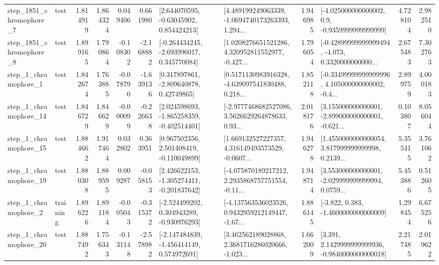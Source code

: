 \begin{tabular}{llrrrrllrlrr}
  step\_1851\_chromophore\_7 &      test &      1.814919 &    1.864324 &      0.049406 &  0.661980 &     [2.644070595, -0.63045902, 0.854424213] &  [4.489199249063339, -1.0694740173263393, 1.294... &       1.946985 &     [-4.025000000000002, 0.9, -0.9359999999999999] &            4.728104 &          2.982510 \\
  step\_1851\_chromophore\_8 &      test &      1.899165 &    1.790864 &     -0.108302 & -2.168882 &   [-0.264434245, -2.693996017, 0.345770084] &  [1.0208276651521286, 4.320952811552977, -0.427... &       1.796054 &  [-0.42899999999999494, -4.073, 0.3320000000000... &            2.675483 &          7.302763 \\
     step\_1\_chromophore\_1 &      test &      1.842674 &    1.763885 &     -0.078790 & -1.639136 &     [0.317897861, -2.809640878, 0.42749865] &  [0.5171130983916328, -4.639097541830488, 0.218... &       1.852118 &  [-0.33499999999999996, 4.105000000000002, -0.4... &            2.899759 &          4.000183 \\
    step\_1\_chromophore\_14 &      test &      1.846729 &    1.846629 &     -0.000099 & -0.226638 &   [2.024598693, -1.865258359, -0.402514401] &  [-2.9777468682527086, 3.5626629264878633, 0.93... &       2.018176 &  [3.155000000000001, -2.899000000000001, -0.621... &            0.103807 &          8.056044 \\
    step\_1\_chromophore\_15 &      test &      1.884662 &    1.917464 &      0.032802 &  0.363951 &    [0.967502356, 2.501408419, -0.110049899] &  [1.669132527227357, 4.316149493573529, -0.0607... &       1.946278 &  [1.4550000000000054, 3.817999999999998, 0.2139... &            5.355415 &          3.761062 \\
    step\_1\_chromophore\_19 &      test &      1.880308 &    1.889595 &      0.009287 & -0.058153 &   [2.426622153, -1.305274411, -0.201837642] &  [-4.075870189217212, 2.2935868757751554, -0.11... &       1.948714 &  [3.553000000000001, -2.029999999999994, 0.0759... &            5.453886 &          0.512605 \\
     step\_1\_chromophore\_2 &  training &      1.896226 &    1.891184 &     -0.005043 & -0.315372 &   [-2.524499202, 0.304943289, -0.930976293] &  [-4.137563536023526, 0.9432959212149447, -1.67... &       1.886145 &               [-3.822, 0.383, -1.4600000000000009] &            1.298454 &          6.675256 \\
    step\_1\_chromophore\_20 &      test &      1.887492 &    1.756343 &     -0.131148 & -2.578982 &   [-2.147484839, -1.456414149, 0.574972691] &  [3.462562189028868, 2.3681716286020666, -1.023... &       1.662009 &   [3.391, 2.1429999999999936, -0.9840000000000018] &            2.217485 &          2.019622 \\

\end{tabular}
